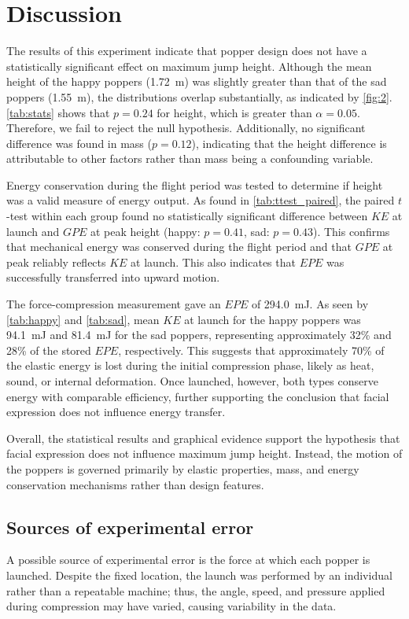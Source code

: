 \documentclass[reprint,amsmath,amssymb,aps,twoside]{revtex4-2} %
\begin{document}
\section{Discussion}
The results of this experiment indicate that popper design does not have a statistically significant effect on maximum jump height. Although the mean height of the happy poppers (\qty{1.72}{\meter}) was slightly greater than that of the sad poppers (\qty{1.55}{\meter}), the distributions overlap substantially, as indicated by \cref{fig:2}. \cref{tab:stats} shows that $p=0.24$ for height, which is greater than $\alpha=0.05$. Therefore, we fail to reject the null hypothesis. Additionally, no significant difference was found in mass ($p = 0.12$), indicating that the height difference is attributable to other factors rather than mass being a confounding variable. 

Energy conservation during the flight period was tested to determine if height was a valid measure of energy output. As found in \cref{tab:ttest_paired}, the paired $t$-test within each group found no statistically significant difference between $KE$ at launch and $GPE$ at peak height (happy: $p = 0.41$, sad: $p = 0.43$). This confirms that mechanical energy was conserved during the flight period and that $GPE$ at peak reliably reflects $KE$ at launch. This also indicates that $EPE$ was successfully transferred into upward motion.

The force-compression measurement gave an $EPE$ of \qty{294.0}{\milli\joule}. As seen by \cref{tab:happy} and \cref{tab:sad}, mean $KE$ at launch for the happy poppers was \qty{94.1}{\milli\joule} and \qty{81.4}{\milli\joule} for the sad poppers, representing approximately \num{32}\% and \num{28}\% of the stored $EPE$, respectively. This suggests that approximately \num{70}\% of the elastic energy is lost during the initial compression phase, likely as heat, sound, or internal deformation. Once launched, however, both types conserve energy with comparable efficiency, further supporting the conclusion that facial expression does not influence energy transfer.

Overall, the statistical results and graphical evidence  support the hypothesis that facial expression does not influence maximum jump height. Instead, the motion of the poppers is governed primarily by elastic properties, mass, and energy conservation mechanisms rather than design features.
\vspace{3em}

\subsection{Sources of experimental error} 
A possible source of experimental error is the force at which each popper is launched. Despite the fixed location, the launch was performed by an individual rather than a repeatable machine; thus, the angle, speed, and pressure applied during compression may have varied, causing variability in the data. 
\end{document}
